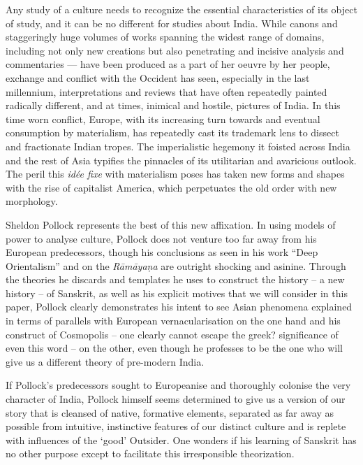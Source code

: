 Any study of a culture needs to recognize the essential characteristics of its object of study, and it can be no different for studies about India. While canons and staggeringly huge volumes of works spanning the widest range of domains, including not only new creations but also penetrating and incisive analysis and commentaries — have been produced as a part of her oeuvre by her people, exchange and conflict with the Occident has seen, especially in the last millennium, interpretations and reviews that have often repeatedly painted radically different, and at times, inimical and hostile, pictures of India. In this time worn conflict, Europe, with its increasing turn towards and eventual consumption by materialism, has repeatedly cast its trademark lens to dissect and fractionate Indian tropes. The imperialistic hegemony it foisted across India and the rest of Asia typifies the pinnacles of its utilitarian and avaricious outlook. The peril this \textit{idée fixe} with materialism poses has taken new forms and shapes with the rise of capitalist America, which perpetuates the old order with new morphology.

Sheldon Pollock represents the best of this new affixation. In using models of power to analyse culture, Pollock does not venture too far away from his European predecessors, though his conclusions as seen in his work “Deep Orientalism” and on the \textit{Rāmāyaṇa} are outright shocking and asinine. Through the theories he discards and templates he uses to construct the history – a new history – of Sanskrit, as well as his explicit motives that we will consider in this paper, Pollock clearly demonstrates his intent to see Asian phenomena explained in terms of parallels with European vernacularisation on the one hand and his construct of Cosmopolis – one clearly cannot escape the greek? significance of even this word – on the other, even though he professes to be the one who will give us a different theory of pre-modern India.

If Pollock’s predecessors sought to Europeanise and thoroughly colonise the very character of India, Pollock himself seems determined to give us a version of our story that is cleansed of native, formative elements, separated as far away as possible from intuitive, instinctive features of our distinct culture and is replete with influences of the ‘good’ Outsider. One wonders if his learning of Sanskrit has no other purpose except to facilitate this irresponsible theorization.

